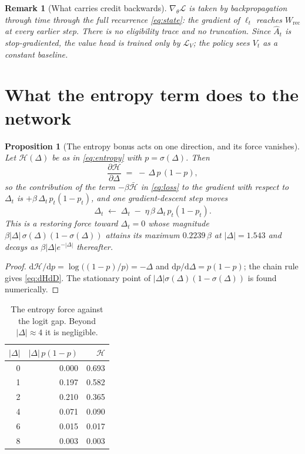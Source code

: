 \documentclass[11pt]{article}
\newtheorem{proposition}{Proposition}
\newtheorem{remark}{Remark}
\newcommand{\1}{\mathbf{1}}
\begin{document}
\begin{remark}[What carries credit backwards]
$\nabla_\theta \mathcal{L}$ is taken by backpropagation through time through the full
recurrence \eqref{eq:state}: the gradient of $\ell_t$ reaches $W_{\mathrm{rec}}$ at every
earlier step. There is no eligibility trace and no truncation. Since $\hat A_t$ is
stop-gradiented, the value head is trained \emph{only} by $\mathcal{L}_V$; the policy sees
$V_t$ as a constant baseline.
\end{remark}

\section{What the entropy term does to the network}\label{sec:ent}

\begin{proposition}[The entropy bonus acts on one direction, and its force vanishes]
\label{prop:ent}
Let $\mathcal{H}(\Delta)$ be as in \eqref{eq:entropy} with $p = \sigma(\Delta)$. Then
\begin{equation}
  \frac{\partial \mathcal{H}}{\partial \Delta} \;=\; -\,\Delta\, p\,(1-p),
  \label{eq:dHdD}
\end{equation}
so the contribution of the term $-\beta \bar{\mathcal{H}}$ in \eqref{eq:loss} to the gradient
with respect to $\Delta_t$ is $+\beta\,\Delta_t\, p_t(1-p_t)$, and one gradient-descent step
moves
\begin{equation}
  \Delta_t \;\leftarrow\; \Delta_t \;-\; \eta\,\beta\,\Delta_t\,p_t(1-p_t) .
  \label{eq:restoring}
\end{equation}
This is a restoring force toward $\Delta_t = 0$ whose magnitude
$\beta|\Delta|\,\sigma(\Delta)(1-\sigma(\Delta))$ attains its maximum $0.2239\,\beta$ at
$|\Delta| = 1.543$ and decays as $\beta|\Delta|e^{-|\Delta|}$ thereafter.
\end{proposition}

\begin{proof}
$\mathrm{d}\mathcal{H}/\mathrm{d}p = \log\!\bigl((1-p)/p\bigr) = -\Delta$ and
$\mathrm{d}p/\mathrm{d}\Delta = p(1-p)$; the chain rule gives \eqref{eq:dHdD}. The stationary
point of $|\Delta|\sigma(\Delta)(1-\sigma(\Delta))$ is found numerically.
\end{proof}

\begin{table}[h]\centering
\begin{tabular}{rrr}
\toprule
$|\Delta|$ & $|\Delta|\,p(1-p)$ & $\mathcal{H}$ \\
\midrule
0 & 0.000 & 0.693 \\
1 & 0.197 & 0.582 \\
2 & 0.210 & 0.365 \\
4 & 0.071 & 0.090 \\
6 & 0.015 & 0.017 \\
8 & 0.003 & 0.003 \\
\bottomrule
\end{tabular}
\caption{The entropy force against the logit gap. Beyond $|\Delta|\approx 4$ it is
negligible.}
\end{table}
\end{document}
